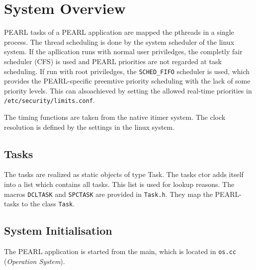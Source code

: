 \section{System Overview}

PEARL tasks of a PEARL application are mapped the pthreads in a single
process.  The thread scheduling is done by the system scheduler of the 
linux system. If the apllication runs with normal user priviledges, the
completly fair scheduler (CFS) is used and PEARL priorities are not
regarded at task scheduling. If run with root priviledges, the 
\texttt{SCHED\_FIFO} scheduler is used, which provides the 
PEARL-specific preemtive priority scheduling with the lack of some 
priority levels. This can alsoachieved by setting the allowed
real-time priorities in \verb|/etc/security/limits.conf|.

The timing functions are taken from the native itimer system.
The clock resolution is defined by the settings in the linux system.

\subsection{Tasks}
The tasks are realized as static objects of type Task.
The tasks ctor adds itself into a list which contains all tasks.
This list is used for lookup reasons. 
The macros \texttt{DCLTASK} and \texttt{SPCTASK} are provided in 
\texttt{Task.h}. They map the PEARL-tasks to the class \texttt{Task}.

\subsection{System Initialisation}
The PEARL application is started from the main, which is located in 
\verb|os.cc| ({\em Operation System}).

